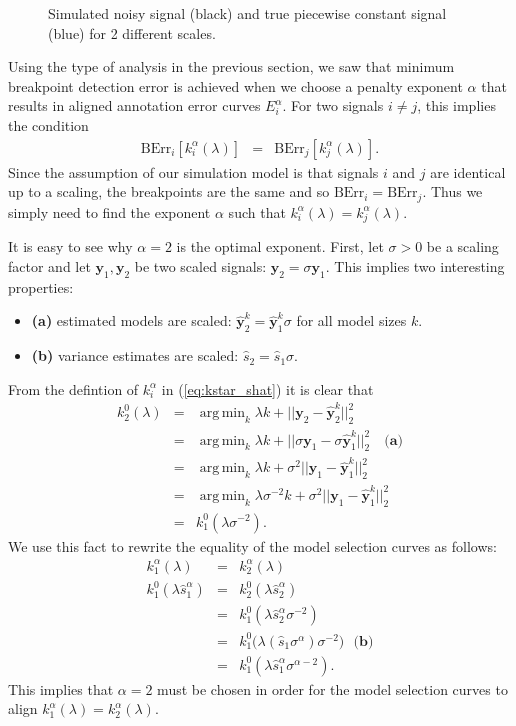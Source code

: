 \documentclass{jsfds} %
\newcommand{\fig}[3][H]{
  \begin{figure}[#1]
    \hskip -1cm
    
    \caption{#3}
    \label{fig:#2}
  \end{figure}
}
\DeclareMathOperator*{\argmin}{arg\,min}
\begin{document}
\fig{variable-scale-signals}{Simulated noisy signal (black) and true piecewise constant 
  signal (blue) for 2 different scales.}

\newpage
Using the type of analysis in the previous section, we saw that
minimum breakpoint detection error is achieved when we choose a
penalty exponent $\alpha$ that results in aligned annotation error
curves $E_i^\alpha$. For two signals $i\neq j$, this implies the
condition
\begin{eqnarray}
  \label{eq:equal_err}
  \text{BErr}_i[k^\alpha_i(\lambda)]&=&  
  \text{BErr}_j[k^\alpha_j(\lambda)].
\end{eqnarray}
Since the assumption of our simulation model is that signals $i$ and
$j$ are identical up to a scaling, the breakpoints are the same and so
$\text{BErr}_i=\text{BErr}_j$. Thus we simply need to find the 
exponent $\alpha$ such that $k^\alpha_i(\lambda)=k^\alpha_j(\lambda)$.

It is easy to see why $\alpha=2$ is the optimal exponent. First, let
$\sigma>0$ be a scaling factor and let $\mathbf y_1, \mathbf y_2$ be
two scaled signals: $\mathbf
y_2=\sigma \mathbf y_1$. This implies two interesting properties:
\begin{itemize}
\item \textbf{(a)} estimated models are scaled: $\mathbf{\hat y}_2^k = \mathbf{\hat y}_1^k\sigma$ for all model sizes $k$.
\item \textbf{(b)} variance estimates are scaled:
  $\hat s_2 = \hat s_1 \sigma$.
\end{itemize}
From the defintion of $k^\alpha_i$ in (\ref{eq:kstar_shat}) it
is clear that
\begin{eqnarray*}
  \label{eq:k2=k1}
  k^0_2(\lambda) 
  &=& \argmin_k \lambda k + ||\mathbf y_2 - \mathbf{\hat y}_2^k||_2^2\\
  &=&\argmin_k \lambda k + ||\sigma \mathbf y_1 - \sigma \mathbf{\hat y}_1^k||_2^2 
  \ \ \ \textbf{ (a)}\\
  &=&\argmin_k \lambda k + \sigma^2||\mathbf y_1 - \mathbf{\hat y}_1^k||_2^2\\
  &=&\argmin_k \lambda\sigma^{-2} k+\sigma^2||\mathbf y_1 - \mathbf{\hat y}_1^k||_2^2\\
  &=& k^0_1(\lambda \sigma^{-2}).
\end{eqnarray*}
We use this fact to rewrite the equality of the model selection curves
as follows:
\begin{eqnarray*}
  k_1^\alpha(\lambda) &=& k_2^\alpha(\lambda) \\
k_1^0(\lambda \hat s_1^\alpha) &=& k_2^0(\lambda \hat s_2^\alpha)\\
&=& k^0_1(\lambda\hat s_2^\alpha\sigma^{-2})\\
&=&k_1^0\big(\lambda(\hat s_1\sigma^\alpha)\sigma^{-2}\big)\ \ \ \textbf{(b)}\\
&=&k_1^0(\lambda\hat s_1^\alpha \sigma^{\alpha-2}).
\end{eqnarray*}
This implies that $\alpha=2$ must be chosen in order for the model
selection curves to align $k_1^\alpha(\lambda)=k_2^\alpha(\lambda)$.
\end{document}
